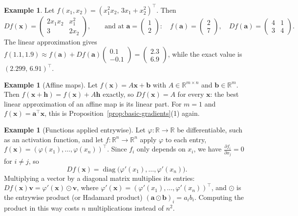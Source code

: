\documentclass[11pt]{article}
\theoremstyle{definition}
\newtheorem{example}[definition]{Example}
\theoremstyle{plain}
\theoremstyle{remark}
\DeclareMathOperator{\diag}{diag}
\begin{document}
\begin{example}\label{ex:jacobian}
    Let $f(x_1, x_2) = (x_1^2 x_2, \, 3x_1 + x_2^2)^\top$. Then
    \[Df(\mathbf{x}) = \begin{pmatrix} 2x_1 x_2 & x_1^2 \\ 3 & 2x_2 \end{pmatrix}, \qquad \text{and at } \mathbf{a} = \begin{pmatrix} 1 \\ 2 \end{pmatrix}: \quad f(\mathbf{a}) = \begin{pmatrix} 2 \\ 7 \end{pmatrix}, \quad Df(\mathbf{a}) = \begin{pmatrix} 4 & 1 \\ 3 & 4 \end{pmatrix}.\]
    The linear approximation gives $f(1.1, 1.9) \approx f(\mathbf{a}) + Df(\mathbf{a}) \begin{pmatrix} 0.1 \\ -0.1 \end{pmatrix} = \begin{pmatrix} 2.3 \\ 6.9 \end{pmatrix}$, while the exact value is $(2.299, \, 6.91)^\top$.
\end{example}

\begin{example}[Affine maps]\label{ex:affine-jacobian}
    Let $f(\mathbf{x}) = A\mathbf{x} + \mathbf{b}$ with $A \in \mathbb{R}^{m \times n}$ and $\mathbf{b} \in \mathbb{R}^m$. Then $f(\mathbf{x} + \mathbf{h}) = f(\mathbf{x}) + A\mathbf{h}$ exactly, so $Df(\mathbf{x}) = A$ for every $\mathbf{x}$: the best linear approximation of an affine map is its linear part. For $m = 1$ and $f(\mathbf{x}) = \mathbf{a}^\top \mathbf{x}$, this is Proposition~\ref{prop:basic-gradients}(1) again.
\end{example}

\begin{example}[Functions applied entrywise]\label{ex:entrywise}
    Let $\varphi: \mathbb{R} \to \mathbb{R}$ be differentiable, such as an activation function, and let $f: \mathbb{R}^n \to \mathbb{R}^n$ apply $\varphi$ to each entry, $f(\mathbf{x}) = (\varphi(x_1), \ldots, \varphi(x_n))^\top$. Since $f_i$ only depends on $x_i$, we have $\frac{\partial f_i}{\partial x_j} = 0$ for $i \neq j$, so
    \[Df(\mathbf{x}) = \diag\big(\varphi'(x_1), \ldots, \varphi'(x_n)\big).\]
    Multiplying a vector by a diagonal matrix multiplies its entries: $Df(\mathbf{x})\mathbf{v} = \varphi'(\mathbf{x}) \odot \mathbf{v}$, where $\varphi'(\mathbf{x}) = (\varphi'(x_1), \ldots, \varphi'(x_n))^\top$, and $\odot$ is the entrywise product (or Hadamard product) $(\mathbf{a} \odot \mathbf{b})_i = a_i b_i$. Computing the product in this way costs $n$ multiplications instead of $n^2$.
\end{example}
\end{document}
